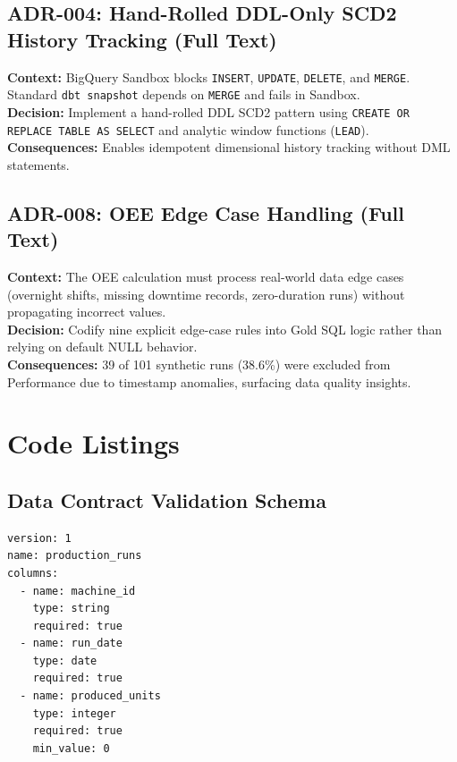 \documentclass[12pt, a4paper]{report}
\begin{document}

\section{ADR-004: Hand-Rolled DDL-Only SCD2 History Tracking (Full Text)}
\textbf{Context:} BigQuery Sandbox blocks \texttt{INSERT}, \texttt{UPDATE}, \texttt{DELETE}, and \texttt{MERGE}. Standard \texttt{dbt snapshot} depends on \texttt{MERGE} and fails in Sandbox. \\
\textbf{Decision:} Implement a hand-rolled DDL SCD2 pattern using \texttt{CREATE OR REPLACE TABLE AS SELECT} and analytic window functions (\texttt{LEAD}). \\
\textbf{Consequences:} Enables idempotent dimensional history tracking without DML statements.

\section{ADR-008: OEE Edge Case Handling (Full Text)}
\textbf{Context:} The OEE calculation must process real-world data edge cases (overnight shifts, missing downtime records, zero-duration runs) without propagating incorrect values. \\
\textbf{Decision:} Codify nine explicit edge-case rules into Gold SQL logic rather than relying on default NULL behavior. \\
\textbf{Consequences:} 39 of 101 synthetic runs (38.6\%) were excluded from Performance due to timestamp anomalies, surfacing data quality insights.

\chapter{Code Listings}
\label{app:code}

\section{Data Contract Validation Schema}
\begin{lstlisting}[style=yamlstyle, caption={YAML Bronze Data Contract Schema Example}, label={lst:contract-yaml}]
version: 1
name: production_runs
columns:
  - name: machine_id
    type: string
    required: true
  - name: run_date
    type: date
    required: true
  - name: produced_units
    type: integer
    required: true
    min_value: 0
\end{lstlisting}
\end{document}
